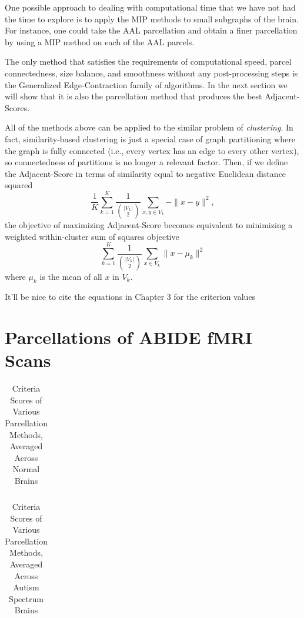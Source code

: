 One possible approach to dealing with computational time that we have
not had the time to explore is to apply the MIP methods to small
subgraphs of the brain. For instance, one could take the AAL
parcellation and obtain a finer parcellation by using a MIP method on
each of the AAL parcels.

The only method that satisfies the requirements of computational speed,
parcel connectedness, size balance, and smoothness without any
post-processing steps is the Generalized Edge-Contraction family of
algorithms. In the next section we will show that it is also the
parcellation method that produces the best Adjacent-Scores.

All of the methods above can be applied to the similar problem of
\textit{clustering}. In fact, similarity-based clustering is just a
special case of graph partitioning where the graph is fully connected
(i.e., every vertex has an edge to every other vertex), so connectedness
of partitions is no longer a relevant factor. Then, if we define the
Adjacent-Score in terms of similarity equal to negative Euclidean
distance squared
\[ \frac{1}{K}\sum_{k=1}^K \frac{1}{{|V_k| \choose 2}}
   \sum_{x,y \in V_k} - \|x - y\|^2, \]
the objective of maximizing Adjacent-Score becomes equivalent to 
minimizing a weighted within-cluster sum of squares objective
\[ \sum_{k=1}^K \frac{1}{{|V_k| \choose 2}}
   \sum_{x \in V_k} \|x - \mu_k\|^2 \]
where $\mu_k$ is the mean of all $x$ in $V_k$.

{\color{red}It'll be nice to cite the equations in Chapter 3 for
the criterion values}

\section{Parcellations of ABIDE fMRI Scans}

\begin{table}
\caption{Criteria Scores of Various Parcellation Methods, %
Averaged Across Normal Brains}
\label{normal}
\begin{tabular}{l | r r r r r r}

\end{tabular}
\end{table}

\begin{table}
\caption{Criteria Scores of Various Parcellation Methods, %
Averaged Across Autism Spectrum Brains}
\label{autism}
\begin{tabular}{l | r r r r r r}

\end{tabular}
\end{table}


